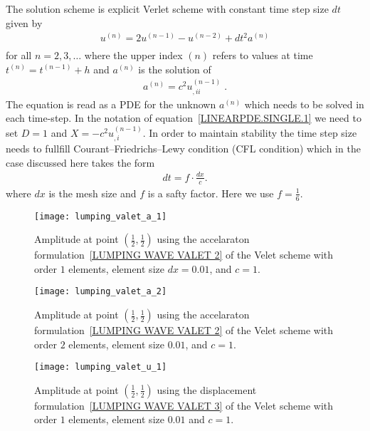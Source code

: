 The solution scheme is explicit Verlet scheme with constant time step size $dt$ given by 
\begin{eqnarray} \label{LUMPING WAVE VALET}
u^{(n)}=2u^{(n-1)}-u^{(n-2)} + dt^2 a^{(n)} \\
\end{eqnarray}
for all $n=2,3,\ldots$ where the upper index ${(n)}$ refers to values at time $t^{(n)}=t^{(n-1)}+h$ and
$a^{(n)}$ is the solution of 
\begin{eqnarray} \label{LUMPING WAVE VALET 2} 
a^{(n)}=c^2 u^{(n-1)}_{,ii} \; .
\end{eqnarray}
The equation is read as a PDE for the unknown $a^{(n)}$ which needs to be solved in each time-step. 
In the notation of equation~\ref{LINEARPDE.SINGLE.1} we need to set $D=1$ and 
$X=-c^2 u^{(n-1)}_{,i}$. In order to maintain stability the time step size needs to fullfill 
Courant–Friedrichs–Lewy condition (CFL condition) which 
in the case discussed here takes the form
\begin{eqnarray} \label{LUMPING WAVE CFL} 
dt = f \cdot \frac{dx}{c} .
\end{eqnarray}
where $dx$ is the mesh size and $f$ is a safty factor. Here we use $f=\frac{1}{6}$.

\begin{figure}
\centerline{\texttt{[image: lumping\_valet\_a\_1]}}
\caption{Amplitude at point $(\frac{1}{2},\frac{1}{2})$ using the accelaraton formulation~\ref{LUMPING WAVE VALET 2} of the 
Velet scheme with order $1$ elements, element size $dx=0.01$, and $c=1$.}
\label{FIG LUMPING VALET A}
\end{figure}

\begin{figure}
\centerline{\texttt{[image: lumping\_valet\_a\_2]}}
\caption{Amplitude at point $(\frac{1}{2},\frac{1}{2})$ using the accelaraton formulation~\ref{LUMPING WAVE VALET 2} of the 
Velet scheme with order $2$ elements, element size $0.01$, and $c=1$.}
\label{FIG LUMPING VALET B}
\end{figure}

\begin{figure}
\centerline{\texttt{[image: lumping\_valet\_u\_1]}}
\caption{Amplitude at point $(\frac{1}{2},\frac{1}{2})$ using the displacement formulation~\ref{LUMPING WAVE VALET 3} of the 
Velet scheme with order $1$ elements, element size $0.01$ and $c=1$.}
\label{FIG LUMPING VALET C}
\end{figure}

